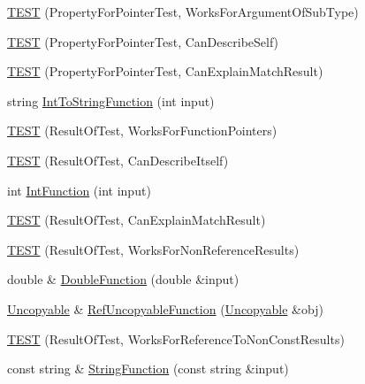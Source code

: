 \begin{DoxyCompactItemize}
\item 
\hyperlink{namespacetesting_1_1gmock__matchers__test_a4c2f4b483550e2e70b09eea3836b83e0}{T\+E\+ST} (Property\+For\+Pointer\+Test, Works\+For\+Argument\+Of\+Sub\+Type)
\item 
\hyperlink{namespacetesting_1_1gmock__matchers__test_a064fc5dd5ca0106e8ed0fbc483472186}{T\+E\+ST} (Property\+For\+Pointer\+Test, Can\+Describe\+Self)
\item 
\hyperlink{namespacetesting_1_1gmock__matchers__test_a1a7e2a9641a06e492d58c75d900330d3}{T\+E\+ST} (Property\+For\+Pointer\+Test, Can\+Explain\+Match\+Result)
\item 
string \hyperlink{namespacetesting_1_1gmock__matchers__test_a2399c4fae49f898c02f57a42047d80f2}{Int\+To\+String\+Function} (int input)
\item 
\hyperlink{namespacetesting_1_1gmock__matchers__test_a5aea17c7d3dd74cbc0cbf181b3a9e5f8}{T\+E\+ST} (Result\+Of\+Test, Works\+For\+Function\+Pointers)
\item 
\hyperlink{namespacetesting_1_1gmock__matchers__test_a1b5240d2272b679d7e3035554c2c5688}{T\+E\+ST} (Result\+Of\+Test, Can\+Describe\+Itself)
\item 
int \hyperlink{namespacetesting_1_1gmock__matchers__test_a6e957b9dcda1186c6274a8895d1514b5}{Int\+Function} (int input)
\item 
\hyperlink{namespacetesting_1_1gmock__matchers__test_ab7fe283b2955ca8bb11b2984a08eef33}{T\+E\+ST} (Result\+Of\+Test, Can\+Explain\+Match\+Result)
\item 
\hyperlink{namespacetesting_1_1gmock__matchers__test_a86f01e29ee48050d401fceca21d1041e}{T\+E\+ST} (Result\+Of\+Test, Works\+For\+Non\+Reference\+Results)
\item 
double \& \hyperlink{namespacetesting_1_1gmock__matchers__test_a48350ba4c1ce65694ec07e9c1c49a452}{Double\+Function} (double \&input)
\item 
\hyperlink{classtesting_1_1gmock__matchers__test_1_1_uncopyable}{Uncopyable} \& \hyperlink{namespacetesting_1_1gmock__matchers__test_aa6f7dd285163d5880cfd6685bec8cab4}{Ref\+Uncopyable\+Function} (\hyperlink{classtesting_1_1gmock__matchers__test_1_1_uncopyable}{Uncopyable} \&obj)
\item 
\hyperlink{namespacetesting_1_1gmock__matchers__test_a505e866c4066d27854cb6754c66a3eec}{T\+E\+ST} (Result\+Of\+Test, Works\+For\+Reference\+To\+Non\+Const\+Results)
\item 
const string \& \hyperlink{namespacetesting_1_1gmock__matchers__test_a5fdf1ecaf8e8e8ef5d57c311e675841d}{String\+Function} (const string \&input)

\end{DoxyCompactItemize}

